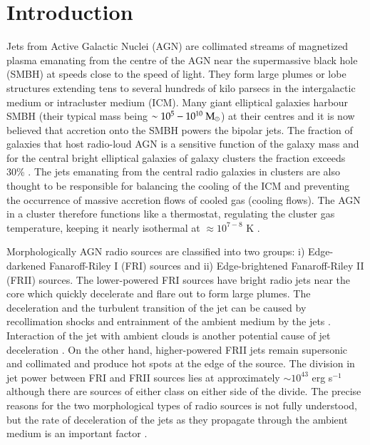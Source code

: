 \chapter{Introduction}\label{introduction}

Jets from Active Galactic Nuclei (AGN) are collimated streams of magnetized plasma emanating from the centre of the AGN near the supermassive black hole (SMBH) at speeds close to the speed of light. They form large plumes or lobe structures extending tens to several hundreds of kilo parsecs in the intergalactic medium or intracluster medium (ICM). Many giant elliptical galaxies harbour SMBH (their typical mass being $\sim 10^5 - 10^{10} \rm \ M_{\odot}$) at their centres and it is now believed that accretion onto the SMBH powers the bipolar jets. The fraction of galaxies that host radio-loud AGN is a sensitive function of the galaxy mass and for the central bright elliptical galaxies of galaxy clusters the fraction exceeds 30\%{} \citep{best05}. The jets emanating from the central radio galaxies in clusters are also thought to be responsible for balancing the cooling of the ICM and preventing the occurrence of massive accretion flows of cooled gas (cooling flows). The AGN in a cluster therefore functions like a thermostat, regulating the cluster gas temperature, keeping it nearly isothermal at $\approx{}10^{7-8}$ K \citep{fabian05}.

Morphologically AGN radio sources are classified into two groups: i) Edge-darkened Fanaroff-Riley I (FRI) sources and ii) Edge-brightened Fanaroff-Riley II (FRII) sources. The lower-powered FRI sources have bright radio jets near the core which quickly decelerate and flare out to form large plumes. The deceleration and the turbulent transition of the jet can be caused by recollimation shocks and entrainment of the ambient medium by the jets \citep{bicknell84}. Interaction of the jet with ambient clouds is another potential cause of jet deceleration \citep{perucho14}. On the other hand, higher-powered FRII jets remain supersonic and collimated and produce hot spots at the edge of the source. The division in jet power between FRI and FRII sources lies at approximately $\sim10^{43}$ erg s$^{-1}$ \citep{bicknell95, ledlow96} although there are sources of either class on either side of the divide. The precise reasons for the two morphological types of radio sources is not fully understood, but the rate of deceleration of the jets as they propagate through the ambient medium is an important factor \citep{bicknell95, kawakatu09}.

